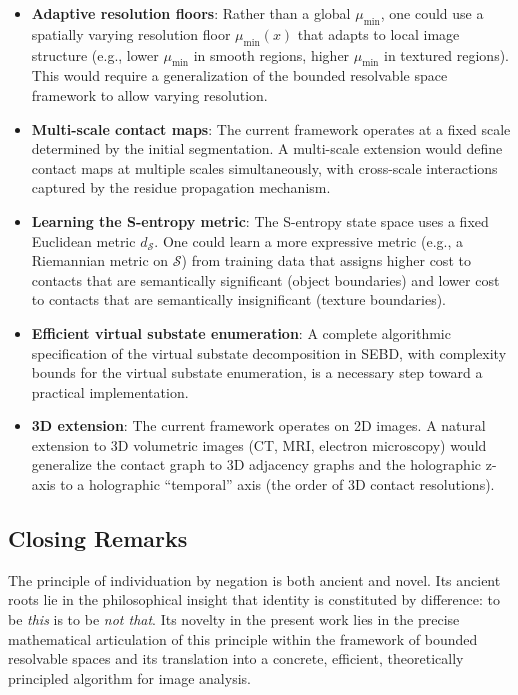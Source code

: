 \documentclass[twocolumn]{article}
\theoremstyle{plain}
\theoremstyle{definition}
\newcommand{\SS}{\mathcal{S}}
\newcommand{\dS}{d_{\mathcal{S}}}
\newcommand{\mumin}{\mu_{\min}}
\begin{document}
\begin{itemize}
\item \textbf{Adaptive resolution floors}: Rather than a global $\mumin$, one
  could use a spatially varying resolution floor $\mumin(x)$ that adapts to
  local image structure (e.g., lower $\mumin$ in smooth regions, higher $\mumin$
  in textured regions). This would require a generalization of the bounded
  resolvable space framework to allow varying resolution.

\item \textbf{Multi-scale contact maps}: The current framework operates at a
  fixed scale determined by the initial segmentation. A multi-scale extension
  would define contact maps at multiple scales simultaneously, with cross-scale
  interactions captured by the residue propagation mechanism.

\item \textbf{Learning the S-entropy metric}: The S-entropy state space uses a
  fixed Euclidean metric $\dS$. One could learn a more expressive metric
  (e.g., a Riemannian metric on $\SS$) from training data that assigns higher
  cost to contacts that are semantically significant (object boundaries) and
  lower cost to contacts that are semantically insignificant (texture boundaries).

\item \textbf{Efficient virtual substate enumeration}: A complete algorithmic
  specification of the virtual substate decomposition in SEBD, with complexity
  bounds for the virtual substate enumeration, is a necessary step toward a
  practical implementation.

\item \textbf{3D extension}: The current framework operates on 2D images. A
  natural extension to 3D volumetric images (CT, MRI, electron microscopy) would
  generalize the contact graph to 3D adjacency graphs and the holographic z-axis
  to a holographic ``temporal'' axis (the order of 3D contact resolutions).
\end{itemize}

\subsection{Closing Remarks}

The principle of individuation by negation is both ancient and novel. Its ancient
roots lie in the philosophical insight that identity is constituted by difference:
to be \emph{this} is to be \emph{not that}. Its novelty in the present work
lies in the precise mathematical articulation of this principle within the
framework of bounded resolvable spaces and its translation into a concrete,
efficient, theoretically principled algorithm for image analysis.
\end{document}
